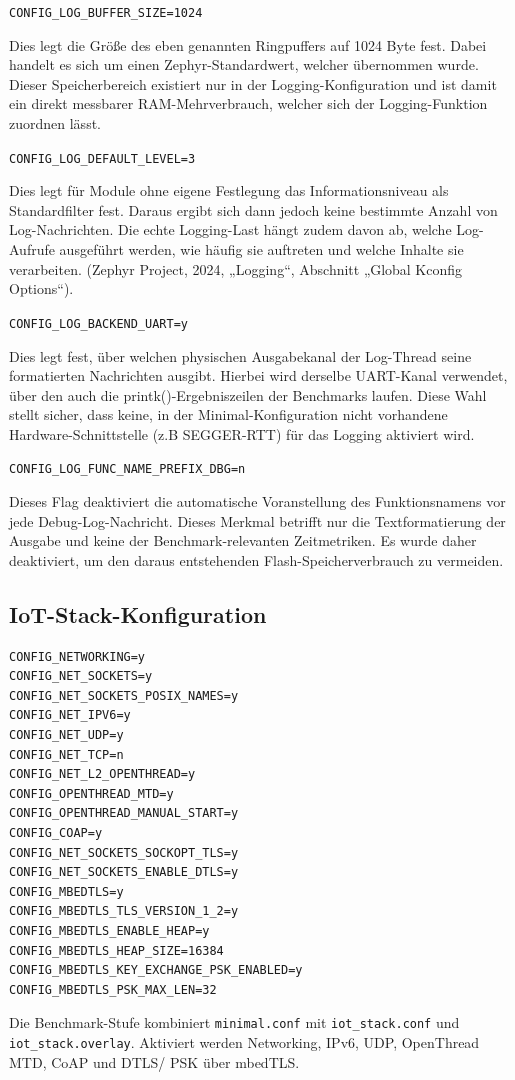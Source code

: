 \lstinline[style=fileinline]|CONFIG_LOG_BUFFER_SIZE=1024|

Dies legt die Größe des eben genannten Ringpuffers auf 1024 Byte fest. Dabei handelt es sich um einen Zephyr-Standardwert, welcher übernommen wurde. Dieser Speicherbereich existiert nur in der Logging-Konfiguration und ist damit ein direkt messbarer RAM-Mehrverbrauch, welcher sich der Logging-Funktion zuordnen lässt.

\lstinline[style=fileinline]|CONFIG_LOG_DEFAULT_LEVEL=3|

Dies legt für Module ohne eigene Festlegung das Informationsniveau als Standardfilter fest. Daraus ergibt sich dann jedoch keine bestimmte Anzahl von Log-Nachrichten. Die echte Logging-Last hängt zudem davon ab, welche Log-Aufrufe ausgeführt werden, wie häufig sie auftreten und welche Inhalte sie verarbeiten.  (Zephyr Project, 2024, „Logging“, Abschnitt „Global Kconfig Options“).

\lstinline[style=fileinline]|CONFIG_LOG_BACKEND_UART=y|

Dies legt fest, über welchen physischen Ausgabekanal der Log-Thread seine formatierten Nachrichten ausgibt. Hierbei wird derselbe UART-Kanal verwendet, über den auch die printk()-Ergebniszeilen der Benchmarks laufen. Diese Wahl stellt sicher, dass keine, in der Minimal-Konfiguration nicht vorhandene Hardware-Schnittstelle (z.B SEGGER-RTT) für das Logging aktiviert wird.

\lstinline[style=fileinline]|CONFIG_LOG_FUNC_NAME_PREFIX_DBG=n|

Dieses Flag deaktiviert die automatische Voranstellung des Funktionsnamens vor jede Debug-Log-Nachricht. Dieses Merkmal betrifft nur die Textformatierung der Ausgabe und keine der Benchmark-relevanten Zeitmetriken. Es wurde daher deaktiviert, um den daraus entstehenden Flash-Speicherverbrauch zu vermeiden.

\subsection{IoT-Stack-Konfiguration}
\begin{lstlisting}[style=basecode,language=Kconfig]
CONFIG_NETWORKING=y
CONFIG_NET_SOCKETS=y
CONFIG_NET_SOCKETS_POSIX_NAMES=y
CONFIG_NET_IPV6=y
CONFIG_NET_UDP=y
CONFIG_NET_TCP=n
CONFIG_NET_L2_OPENTHREAD=y
CONFIG_OPENTHREAD_MTD=y
CONFIG_OPENTHREAD_MANUAL_START=y
CONFIG_COAP=y
CONFIG_NET_SOCKETS_SOCKOPT_TLS=y
CONFIG_NET_SOCKETS_ENABLE_DTLS=y
CONFIG_MBEDTLS=y
CONFIG_MBEDTLS_TLS_VERSION_1_2=y
CONFIG_MBEDTLS_ENABLE_HEAP=y
CONFIG_MBEDTLS_HEAP_SIZE=16384
CONFIG_MBEDTLS_KEY_EXCHANGE_PSK_ENABLED=y
CONFIG_MBEDTLS_PSK_MAX_LEN=32
\end{lstlisting}
Die Benchmark-Stufe kombiniert \lstinline[style=fileinline]|minimal.conf| mit \lstinline[style=fileinline]|iot_stack.conf| und \lstinline[style=fileinline]|iot_stack.overlay|. Aktiviert werden Networking, IPv6, UDP, OpenThread MTD, CoAP und DTLS/ PSK über mbedTLS.

